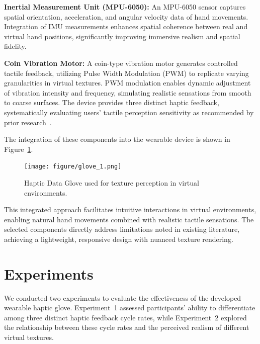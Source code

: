 \documentclass[graybox]{svmult}
\begin{document}
\textbf{Inertial Measurement Unit (MPU-6050):}  
An MPU-6050 sensor captures spatial orientation, acceleration, and angular velocity data of hand movements. Integration of IMU measurements enhances spatial coherence between real and virtual hand positions, significantly improving immersive realism and spatial fidelity.

\textbf{Coin Vibration Motor:}  
A coin-type vibration motor generates controlled tactile feedback, utilizing Pulse Width Modulation (PWM) to replicate varying granularities in virtual textures. PWM modulation enables dynamic adjustment of vibration intensity and frequency, simulating realistic sensations from smooth to coarse surfaces. The device provides three distinct haptic feedback, systematically evaluating users' tactile perception sensitivity as recommended by prior research~\cite{strohmeier2017generating, bensmaia2005vibrations}.

The integration of these components into the wearable device is shown in Figure~\ref{fig:glove_1}.

\begin{figure}\centering
	\texttt{[image: figure/glove\_1.png]}%
	\caption{Haptic Data Glove used for texture perception in virtual environments.}\label{fig:glove_1}
\end{figure}

This integrated approach facilitates intuitive interactions in virtual environments, enabling natural hand movements combined with realistic tactile sensations. The selected components directly address limitations noted in existing literature, achieving a lightweight, responsive design with nuanced texture rendering.

\section{Experiments}
We conducted two experiments to evaluate the effectiveness of the developed wearable haptic glove. Experiment~1 assessed participants' ability to differentiate among three distinct haptic feedback cycle rates, while Experiment~2 explored the relationship between these cycle rates and the perceived realism of different virtual textures.
\end{document}
